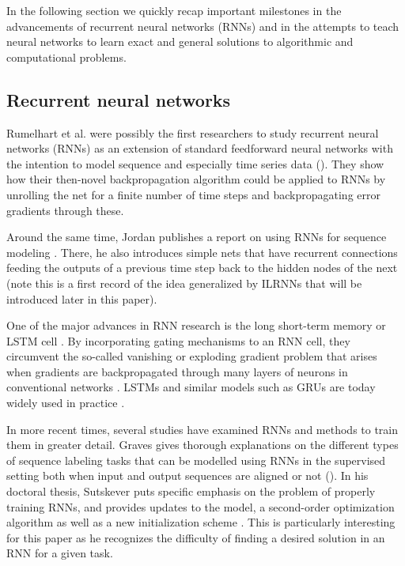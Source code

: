 \documentclass{article}
\begin{document}
In the following section we quickly recap important milestones in the advancements of recurrent neural networks (RNNs) and in the attempts to teach neural networks to learn exact and general solutions to algorithmic and computational problems.

\subsection{Recurrent neural networks}

Rumelhart et al. were possibly the first researchers to study recurrent neural networks (RNNs) as an extension of standard feedforward neural networks with the intention to model sequence and especially time series data (\citeyear{rumelhart1986learning}). They show how their then-novel backpropagation algorithm could be applied to RNNs by unrolling the net for a finite number of time steps and backpropagating error gradients through these.

Around the same time, Jordan publishes a report on using RNNs for sequence modeling \citeyear{jordan1997serial}. There, he also introduces simple nets that have recurrent connections feeding the outputs of a previous time step back to the hidden nodes of the next (note this is a first record of the idea generalized by ILRNNs that will be introduced later in this paper).

One of the major advances in RNN research is the long short-term memory or LSTM cell \cite{hochreiter1997long}. By incorporating gating mechanisms to an RNN cell, they circumvent the so-called vanishing or exploding gradient problem that arises when gradients are backpropagated through many layers of neurons in conventional networks \cite{hochreiter1991untersuchungen, hochreiter2001gradient}. LSTMs and similar models such as GRUs are today widely used in practice \cite{cho2014learning, DBLP:journals/corr/abs-1801-01078}.

In more recent times, several studies have examined RNNs and methods to train them in greater detail. Graves gives thorough explanations on the different types of sequence labeling tasks that can be modelled using RNNs in the supervised setting both when input and output sequences are aligned or not (\citeyear{graves2012supervised}). In his doctoral thesis, Sutskever puts specific emphasis on the problem of properly training RNNs, and provides updates to the model, a second-order optimization algorithm as well as a new initialization scheme \cite{Sutskever:2013:TRN:2604780}. This is particularly interesting for this paper as he recognizes the difficulty of finding a desired solution in an RNN for a given task. 
\end{document}
